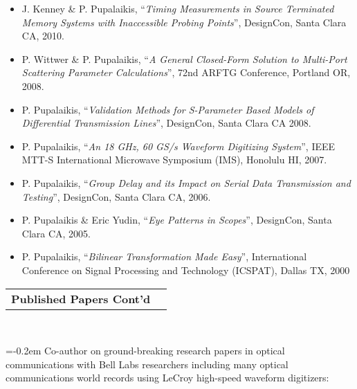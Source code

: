 \documentclass[10pt,letterpaper]{extarticle}
\makeatletter
\newenvironment{indentsection}[1]%
{\begin{list}{}%
	{\setlength{\leftmargin}{#1}}%
	\item[]%
}
{\end{list}}
\newcommand{\headerrow}[2]
{\begin{tabular*}{\linewidth}{l@{\extracolsep{\fill}}r}
	#1 &
	#2 \\
\end{tabular*}}
\makeatother
\begin{document}
\begin{indentsection}{-1em}
\begin{itemize}
\item J. Kenney \& P. Pupalaikis, “\emph{Timing Measurements in Source Terminated Memory Systems with Inaccessible Probing Points}”, DesignCon, Santa Clara CA, 2010. 
\item P. Wittwer \& P. Pupalaikis, “\emph{A General Closed-Form Solution to Multi-Port Scattering Parameter Calculations}”, 72nd ARFTG Conference, Portland OR, 2008. 
\item P. Pupalaikis, “\emph{Validation Methods for S-Parameter Based Models of Differential Transmission Lines}”, DesignCon, Santa Clara CA 2008. 
\item P. Pupalaikis, “\emph{An 18 GHz, 60 GS/s Waveform Digitizing System}”, IEEE MTT-S International Microwave Symposium (IMS), Honolulu HI, 2007. 
\item P. Pupalaikis, “\emph{Group Delay and its Impact on Serial Data Transmission and Testing}”, DesignCon, Santa Clara CA, 2006. 
\item P. Pupalaikis \& Eric Yudin, “\emph{Eye Patterns in Scopes}”, DesignCon, Santa Clara CA, 2005. 
\item P. Pupalaikis, “\emph{Bilinear Transformation Made Easy}”, International Conference on Signal Processing and Technology (ICSPAT), Dallas TX, 2000 
\end{itemize}\end{indentsection}
\clearpage
\headerrow
	{\large \textbf{Published Papers Cont'd}}
	{}\\
\begin{flushleft} 
\parskip=-0.2em
Co-author on ground-breaking research papers in optical communications with Bell Labs researchers including many optical communications world records using LeCroy high-speed waveform digitizers:
\end{flushleft}
\end{document}
